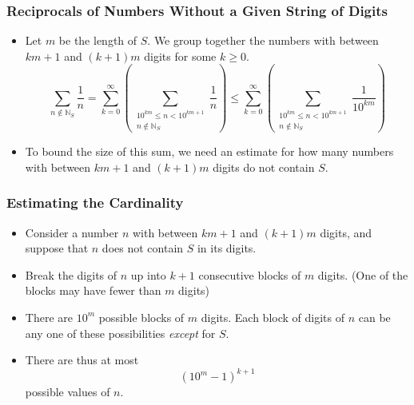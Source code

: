 \documentclass{beamer}
\begin{document}
\begin{frame}
    \frametitle{Reciprocals of Numbers Without a Given String of Digits}

    \begin{itemize}
        \item Let $m$ be the length of $S$. We group together the numbers with between $km + 1$ and $(k + 1)m$ digits for some $k \geq 0$.
        \[
            \sum_{n \not\in \mathbb{N}_S} \frac{1}{n} = \sum_{k = 0}^{\infty} \left( \sum_{\substack{10^{km} \leq n < 10^{km + 1} \\ n \not\in \mathbb{N}_S}} \frac{1}{n} \right) \leq \sum_{k = 0}^{\infty} \left( \sum_{\substack{10^{km} \leq n < 10^{km + 1} \\ n \not\in \mathbb{N}_S}} \frac{1}{10^{km}} \right)
        \]
        \pause
        \item To bound the size of this sum, we need an estimate for how many numbers with between $km + 1$ and $(k + 1)m$ digits do not contain $S$.
    \end{itemize}

\end{frame}

\begin{frame}
    \frametitle{Estimating the Cardinality}

    \begin{itemize}
        \item Consider a number $n$ with between $km + 1$ and $(k + 1)m$ digits, and suppose that $n$ does not contain $S$ in its digits. \pause
        \item Break the digits of $n$ up into $k + 1$ consecutive blocks of $m$ digits. (One of the blocks may have fewer than $m$ digits) \pause
        \item There are $10^m$ possible blocks of $m$ digits. Each block of digits of $n$ can be any one of these possibilities \emph{except} for $S$. \pause
        \item There are thus at most
        \[
            \left( 10^m - 1 \right)^{k + 1}
        \]
        possible values of $n$.
    \end{itemize}

\end{frame}
\end{document}
